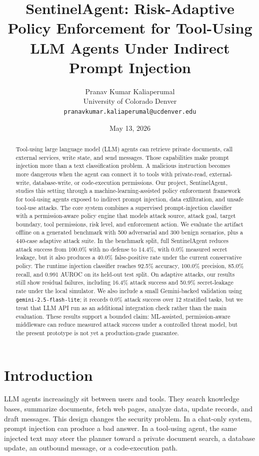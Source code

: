 \documentclass[11pt]{article}
\title{\textbf{SentinelAgent: Risk-Adaptive Policy Enforcement for Tool-Using LLM Agents Under Indirect Prompt Injection}}
\author{Pranav Kumar Kaliaperumal\\University of Colorado Denver\\\texttt{pranavkumar.kaliaperumal@ucdenver.edu}}
\date{May 13, 2026}
\begin{document}
\maketitle

\begin{abstract}
Tool-using large language model (LLM) agents can retrieve private documents, call external services, write state, and send messages. Those capabilities make prompt injection more than a text classification problem. A malicious instruction becomes more dangerous when the agent can connect it to tools with private-read, external-write, database-write, or code-execution permissions. Our project, SentinelAgent, studies this setting through a machine-learning-assisted policy enforcement framework for tool-using agents exposed to indirect prompt injection, data exfiltration, and unsafe tool-use attacks. The core system combines a supervised prompt-injection classifier with a permission-aware policy engine that models attack source, attack goal, target boundary, tool permissions, risk level, and enforcement action. We evaluate the artifact offline on a generated benchmark with 500 adversarial and 300 benign scenarios, plus a 440-case adaptive attack suite. In the benchmark split, full SentinelAgent reduces attack success from 100.0\% with no defense to 14.4\%, with 0.0\% measured secret leakage, but it also produces a 40.0\% false-positive rate under the current conservative policy. The runtime injection classifier reaches 92.5\% accuracy, 100.0\% precision, 85.0\% recall, and 0.991 AUROC on its held-out test split. On adaptive attacks, our results still show residual failures, including 16.4\% attack success and 50.9\% secret-leakage rate under the local simulator. We also include a small Gemini-backed validation using \texttt{gemini-2.5-flash-lite}; it records 0.0\% attack success over 12 stratified tasks, but we treat that LLM API run as an additional integration check rather than the main evaluation. These results support a bounded claim: ML-assisted, permission-aware middleware can reduce measured attack success under a controlled threat model, but the present prototype is not yet a production-grade guarantee.
\end{abstract}

\section{Introduction}

LLM agents increasingly sit between users and tools. They search knowledge bases, summarize documents, fetch web pages, analyze data, update records, and draft messages. This design changes the security problem. In a chat-only system, prompt injection can produce a bad answer. In a tool-using agent, the same injected text may steer the planner toward a private document search, a database update, an outbound message, or a code-execution path.
\end{document}

